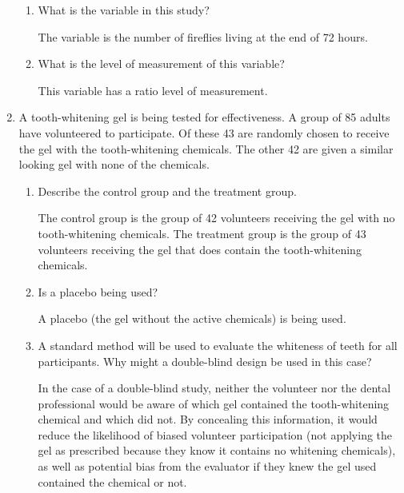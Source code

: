 \documentclass{article}
\newcommand{\answer}[1]{\color{red}#1}
\begin{document}
\begin{enumerate}
\begin{enumerate}
	\item What is the variable in this study? 
	
	{\answer The variable is the number of fireflies living at the end of 72 hours. }
	\vfill
	
	\item What is the level of measurement of this variable? 
	
	{\answer This variable has a ratio level of measurement.}
	\vfill
	
	\end{enumerate}

\item A tooth-whitening gel is being tested for effectiveness.  A group of 85 adults have volunteered to participate.  Of these 43 are randomly chosen to receive the gel with the tooth-whitening chemicals.  The other 42 are given a similar looking gel with none of the chemicals. 

	\begin{enumerate}
	
	\item Describe the control group and the treatment group. 
	
	{\answer The control group is the group of 42 volunteers receiving the gel with no tooth-whitening chemicals.  The treatment group is the group of 43 volunteers receiving the gel that does contain the tooth-whitening chemicals.}
	\vfill
	
	\item Is a placebo being used? 
	
	{\answer A placebo (the gel without the active chemicals) is being used.}
	\vfill
	
	\item A standard method will be used to evaluate the whiteness of teeth for all participants.  Why might a double-blind design be used in this case? 
	
	{\answer In the case of a double-blind study, neither the volunteer nor the dental professional would be aware of which gel contained the tooth-whitening chemical and which did not.  By concealing this information, it would reduce the likelihood of biased volunteer participation (not applying the gel as prescribed because they know it contains no whitening chemicals), as well as potential bias from the evaluator if they knew the gel used contained the chemical or not.}
	\vfill
	
	\end{enumerate}

	
\end{enumerate}

\vfill
\end{document}
